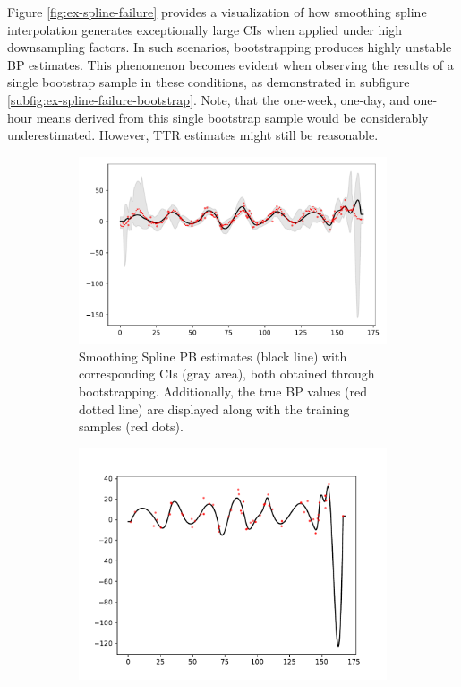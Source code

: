 Figure \ref{fig:ex-spline-failure} provides a visualization of how smoothing
spline interpolation generates exceptionally large CIs when
applied under high downsampling factors.
In such scenarios, bootstrapping produces highly unstable BP estimates.
This phenomenon becomes evident when observing the results of a single bootstrap
sample in these conditions, as demonstrated in subfigure \ref{subfig:ex-spline-failure-bootstrap}.
Note, that the one-week, one-day, and one-hour means derived from this single bootstrap sample
would be considerably underestimated.
However, TTR estimates might still be reasonable.

\begin{figure}[!htb]
\centering
\begin{subfigure}{.5\textwidth}
    \centering
    \includegraphics[width=\linewidth]{Pictures/spline_extreme/plot_posterior_confint_spline}
    \caption{Smoothing Spline PB estimates (black line) with corresponding CIs (gray area),
        both obtained through bootstrapping.
        Additionally, the true BP values (red dotted line) are displayed along
        with the training samples (red dots).}
\end{subfigure}\hfill
\begin{subfigure}{.42\textwidth}
    \centering
    \includegraphics[width=\linewidth]{Pictures/spline_extreme/plot_pred_bootstrap_spline_reg_v2_70}

\end{subfigure}
\end{figure}
